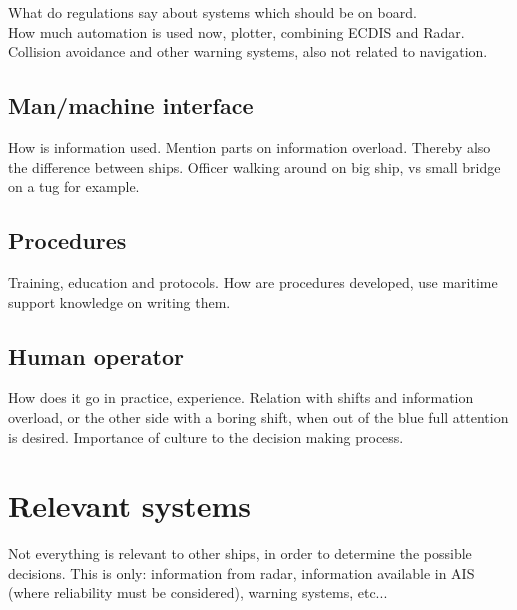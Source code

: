 What do regulations say about systems which should be on board. \\
How much automation is used now, plotter, combining ECDIS and Radar. \\
Collision avoidance and other warning systems, also not related to navigation.


\subsection{Man/machine interface}
How is information used. Mention parts on information overload. Thereby also the difference between ships. Officer walking around on big ship, vs small bridge on a tug for example.

\subsection{Procedures}
Training, education and protocols. How are procedures developed, use maritime support knowledge on writing them.

\subsection{Human operator}
How does it go in practice, experience. Relation with shifts and information overload, or the other side with a boring shift, when out of the blue full attention is desired. Importance of culture to the decision making process.

\section{Relevant systems}
Not everything is relevant to other ships, in order to determine the possible decisions. This is only: information from radar, information available in AIS (where reliability must be considered), warning systems, etc...
